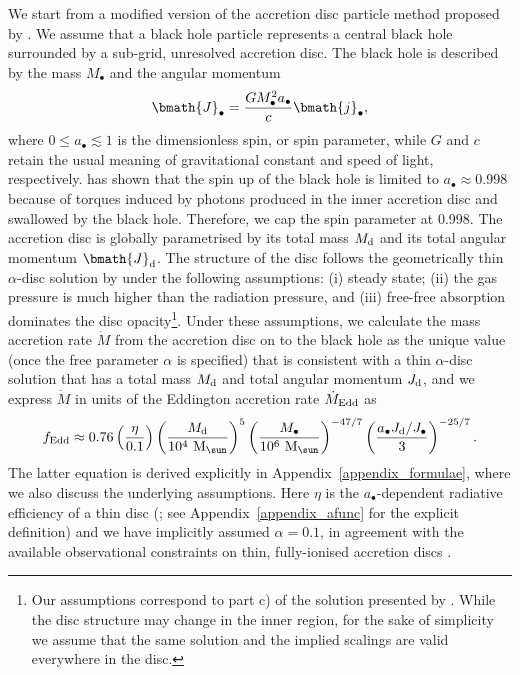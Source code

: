 \documentclass[a4paper,fleqn,usenatbib]{mnras}
\begin{document}
We start from a modified version of the accretion disc particle method proposed by \citet{power+11}.
We assume that a black hole particle represents a central black hole surrounded by a sub-grid, unresolved accretion disc.
The black hole is described by the mass $M_{\bullet}$ and the angular momentum
\begin{equation}
\bmath{J}_{\bullet} = \frac{G M_{\bullet}^2 a_\bullet}{c} \bmath{j}_{\bullet},
\end{equation}
where $0 \leq a_{\bullet} \lesssim 1$ is the dimensionless spin, or spin parameter, while $G$ and $c$ retain the usual meaning of gravitational constant and speed of light, respectively.
\citet{thorne+74} has shown that the spin up of the black hole is limited to $a_{\bullet} \approx 0.998$ because of torques induced by photons produced in the inner accretion disc and swallowed by the black hole. Therefore, we cap the spin parameter at 0.998.
The accretion disc is globally parametrised by its total mass $M_{\rm d}$ and its total angular momentum $\bmath{J}_{\rm d}$.
The structure of the disc follows the geometrically thin $\alpha$-disc solution by \citet{shakura+73} under the following assumptions: (i) steady state; (ii) the gas pressure is much higher than the radiation pressure, and (iii) free-free absorption dominates the disc opacity\footnote{Our assumptions correspond to part c) of the solution presented by  \citet{shakura+73}. While the disc structure may change in the inner region, for the sake of simplicity we assume that the same solution and the implied scalings are valid everywhere in the disc.}.
Under these assumptions, we calculate the mass accretion rate $\dot{M}$ from the accretion disc on to the black hole as the unique value (once the free parameter $\alpha$ is specified) that is consistent with a thin $\alpha$-disc solution that has a total mass $M_{\rm d}$ and total angular momentum $J_{\rm d}$, and we express $\dot{M}$ in units of the Eddington accretion rate $\dot{M}_{\rm Edd}$ as
\begin{equation} \label{eq_f_edd}
f_{\rm Edd} \approx 0.76 \left( \frac{\eta}{0.1} \right) \left( \frac{M_{\rm d}}{10^{4}~{\rm M}_{\sun}} \right)^5 \left(\frac{M_{\bullet}}{10^6~{\rm M}_{\sun}} \right)^{-47/7} \left( \frac{a_{\bullet} J_{\rm d} / J_{\bullet}}{3} \right)^{-25/7}.
\end{equation}
The latter equation is derived explicitly in Appendix~\ref{appendix_formulae}, where we also discuss the underlying assumptions.
Here $\eta$ is the $a_{\bullet}$-dependent radiative efficiency of a thin disc (\citealt{novikov+73}; see Appendix~\ref{appendix_afunc} for the explicit definition) and we have implicitly assumed $\alpha = 0.1$, in agreement with the available observational constraints on thin, fully-ionised accretion discs \citep{king+07}.
\end{document}
